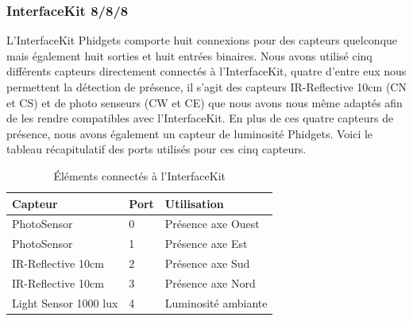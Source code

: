 \subsubsection{InterfaceKit 8/8/8}
L’InterfaceKit Phidgets comporte huit connexions pour des capteurs quelconque mais également huit sorties et huit entrées binaires. Nous avons utilisé cinq différents capteurs directement connectés à l’InterfaceKit, quatre d’entre eux nous permettent la détection de présence, il s’agit des capteurs IR-Reflective 10cm (CN et CS) et de photo senseurs (CW et CE) que nous avons nous même adaptés afin de les rendre compatibles avec l’InterfaceKit. En plus de ces quatre capteurs de présence, nous avons également un capteur de luminosité Phidgets.
Voici le tableau récapitulatif des ports utilisés pour ces cinq capteurs.
\begin{table}[H]
\centering
\captionsetup{width=\textwidth}
{\renewcommand{\arraystretch}{1.5}
    \begin{tabular}{| l | l | l |}
    \hline
    \textbf{Capteur} & \textbf{Port} & \textbf{Utilisation}\\
    \hline
    PhotoSensor  & 0 & Présence axe Ouest\\
    \hline
    PhotoSensor  & 1 & Présence axe Est\\
    \hline
    IR-Reflective 10cm & 2 & Présence axe Sud\\
    \hline
    IR-Reflective 10cm & 3 & Présence axe Nord\\
    \hline
    Light Sensor 1000 lux & 4 & Luminosité ambiante\\
    \hline
    \end{tabular}}
    \caption{Éléments connectés à l'InterfaceKit}
\end{table}

